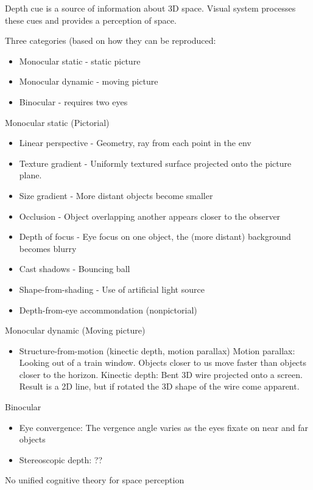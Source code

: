 \documentclass[a4paper]{article}
\begin{document}
Depth cue is a source of information about 3D space. Visual system processes these cues and provides a perception of space. 

Three categories (based on how they can be reproduced:
\begin{itemize}
  \item Monocular static - static picture
  \item Monocular dynamic - moving picture
  \item Binocular - requires two eyes
\end{itemize}

Monocular static (Pictorial)
\begin{itemize}
  \item Linear perspective - Geometry, ray from each point in the env
  \item Texture gradient - Uniformly textured surface projected onto the picture plane.
  \item Size gradient - More distant objects become smaller
  \item Occlusion - Object overlapping another appears closer to the observer
  \item Depth of focus - Eye focus on one object, the (more distant) background becomes blurry
  \item Cast shadows - Bouncing ball
  \item Shape-from-shading - Use of artificial light source
  \item Depth-from-eye accommondation (nonpictorial) 
\end{itemize}

Monocular dynamic (Moving picture)
\begin{itemize}
  \item Structure-from-motion (kinectic depth, motion parallax)
  Motion parallax: Looking out of a train window. Objects closer to us move faster than objects closer to the horizon. 
  Kinectic depth: Bent 3D wire projected onto a screen. Result is a 2D line, but if rotated the 3D shape of the wire come apparent.
\end{itemize}

Binocular
\begin{itemize}
  \item Eye convergence: The vergence angle varies as the eyes fixate on near and far objects
  \item Stereoscopic depth: ??
\end{itemize}

No unified cognitive theory for space perception
\end{document}
